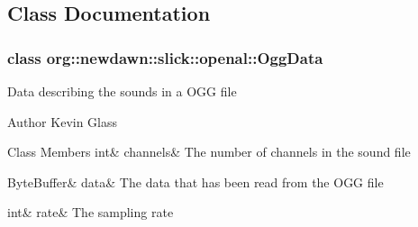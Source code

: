 \subsection{Class Documentation}
\label{classorg_1_1newdawn_1_1slick_1_1openal_1_1_ogg_data}
\subsubsection{class org\+:\+:newdawn\+:\+:slick\+:\+:openal\+:\+:Ogg\+Data}
Data describing the sounds in a O\+GG file

\begin{DoxyAuthor}{Author}
Kevin Glass 
\end{DoxyAuthor}
\begin{DoxyFields}{Class Members}
\mbox{\label{namespaceorg_1_1newdawn_1_1slick_1_1openal_acb0f177b0df2252e15304165315c4a66}} 
int&
channels&
The number of channels in the sound file \\
\hline

\mbox{\label{namespaceorg_1_1newdawn_1_1slick_1_1openal_aa6fef0d144f9a3969b76bf818ec8b3bf}} 
ByteBuffer&
data&
The data that has been read from the O\+GG file \\
\hline

\mbox{\label{namespaceorg_1_1newdawn_1_1slick_1_1openal_ae2503d0f4bc50cbe124f1caba136476d}} 
int&
rate&
The sampling rate \\
\hline

\end{DoxyFields}
